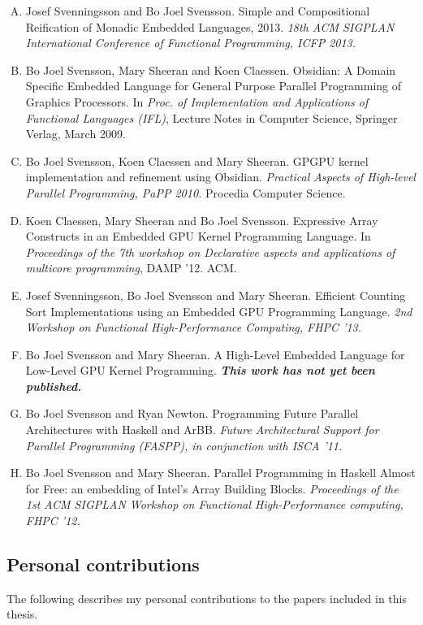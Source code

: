\documentclass[a4paper]{book}
\begin{document}
\begin{enumerate}[A.] 
\item Josef Svenningsson and Bo Joel Svensson. Simple and Compositional Reification of Monadic Embedded Languages, 2013. \emph{18th ACM SIGPLAN International Conference of Functional Programming, ICFP 2013.}
\item Bo Joel Svensson, Mary Sheeran and Koen Claessen. Obsidian: A Domain Specific Embedded Language for General Purpose Parallel Programming of Graphics Processors. In \emph{Proc. of Implementation and Applications of Functional Languages (IFL)}, Lecture Notes in Computer Science, Springer Verlag, March 2009.
\item Bo Joel Svensson, Koen Claessen and Mary Sheeran. GPGPU kernel implementation and refinement using Obsidian. \emph{Practical Aspects of High-level Parallel Programming, PaPP 2010.} Procedia Computer Science.
\item Koen Claessen, Mary Sheeran and Bo Joel Svensson. Expressive Array Constructs in an Embedded GPU Kernel Programming Language. In \emph{Proceedings of the 7th workshop on Declarative aspects and applications of multicore programming}, DAMP '12. ACM. 
\item Josef Svenningsson, Bo Joel Svensson and Mary Sheeran. Efficient Counting Sort Implementations using an Embedded GPU Programming Language. \emph{2nd Workshop on Functional High-Performance Computing, FHPC '13.}
\item Bo Joel Svensson and Mary Sheeran. A High-Level Embedded Language for Low-Level GPU Kernel Programming. {\bf\emph{This work has not yet been published.}} 
\item Bo Joel Svensson and Ryan Newton. Programming Future Parallel Architectures with Haskell and ArBB. \emph{Future Architectural Support for Parallel Programming (FASPP), in conjunction with ISCA '11.}
\item Bo Joel Svensson and Mary Sheeran. Parallel Programming in Haskell Almost for Free: an embedding of Intel's Array Building Blocks. \emph{Proceedings of the 1st ACM SIGPLAN Workshop on Functional High-Performance computing, FHPC '12.}
\end{enumerate} 

\clearpage
\subsection*{Personal contributions} 

The following describes my personal contributions to the papers included 
in this thesis. 
\end{document}
